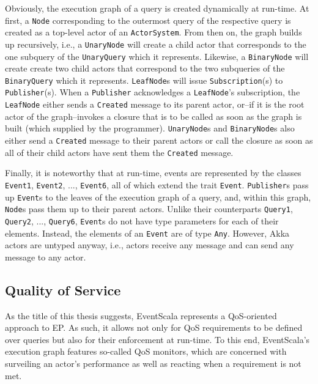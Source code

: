 \documentclass[article, type=bsc, colorback, accentcolor=tud8b, parskip=half, bibliography=totocnumbered]{tudthesis}
\begin{document}
Obviously, the execution graph of a query is created dynamically at run-time.
At first, a \lstinline{Node} corresponding to the outermost query of the respective query is created as a top-level actor of an \lstinline{ActorSystem}.
From then on, the graph builds up recursively, i.e., a \lstinline{UnaryNode} will create a child actor that corresponds to the one subquery of the \lstinline{UnaryQuery} which it represents.
Likewise, a \lstinline{BinaryNode} will create create two child actors that correspond to the two subqueries of the \lstinline{BinaryQuery} which it represents.
\lstinline{LeafNode}s will issue \lstinline{Subscription}(s) to \lstinline{Publisher}(s).
When a \lstinline{Publisher} acknowledges a \lstinline{LeafNode}'s subscription, the \lstinline{LeafNode} either sends a \lstinline{Created} message to its parent actor, or--if it is the root actor of the graph--invokes a closure that is to be called as soon as the graph is built (which supplied by the programmer). \lstinline{UnaryNode}s and \lstinline{BinaryNode}s also either send a \lstinline{Created} message to their parent actors or call the closure as soon as all of their child actors have sent them the \lstinline{Created} message.

Finally, it is noteworthy that at run-time, events are represented by the classes \lstinline{Event1}, \lstinline{Event2}, ..., \lstinline{Event6}, all of which extend the trait \lstinline{Event}.
\lstinline{Publisher}s pass up \lstinline{Event}s to the leaves of the execution graph of a query, and, within this graph, \lstinline{Node}s pass them up to their parent actors.
Unlike their counterparts \lstinline{Query1}, \lstinline{Query2}, ..., \lstinline{Query6}, \lstinline{Event}s do not have type parameters for each of their elements.
Instead, the elements of an \lstinline{Event} are of type \lstinline{Any}.
However, Akka actors are untyped anyway, i.e., actors receive any message and can send any message to any actor.

\subsection{Quality of Service}
\label{sec:qos}

As the title of this thesis suggests, EventScala represents a QoS-oriented approach to EP.
As such, it allows not only for QoS requirements to be defined over queries but also for their enforcement at run-time.
To this end, EventScala's execution graph features so-called QoS monitors, which are concerned with surveiling an actor's performance as well as reacting when a requirement is not met.
\end{document}
